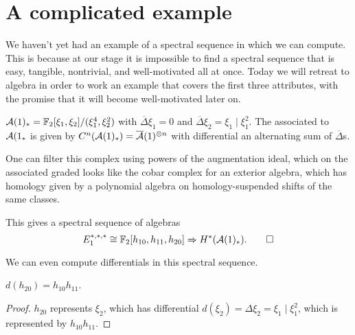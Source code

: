 \section{A complicated example}

We haven't yet had an example of a spectral sequence in which we can compute.  This is because at our stage it is impossible to find a spectral sequence that is easy, tangible, nontrivial, and well-motivated all at once.  Today we will retreat to algebra in order to work an example that covers the first three attributes, with the promise that it will become well-motivated later on.


$\mathcal A(1)_* = \mathbb F_2[\xi_1, \xi_2] / (\xi_1^4, \xi_2^2)$ with $\overline \Delta \xi_1 = 0$ and $\overline \Delta \xi_2 = \xi_1 \mid \xi_1^2$.  The  associated to $\mathcal A(1_*$ is given by $C^n(\mathcal A(1)_*) = \overline {\mathcal A}(1)^{\otimes n}$ with differential an alternating sum of $\overline \Delta$s.

One can filter this complex using powers of the augmentation ideal, which on the associated graded looks like the cobar complex for an exterior algebra, which has homology given by a polynomial algebra on homology-suspended shifts of the same classes.

\begin{theorem}[May]
This gives a spectral sequence of algebras \[E_1^{*, *, *} \cong \mathbb F_2[h_{10}, h_{11}, h_{20}] \Rightarrow H^*(\mathcal A(1)_*). \qed\]
\end{theorem}

We can even compute differentials in this spectral sequence.

\begin{lemma}
$d(h_{20}) = h_{10} h_{11}$.
\end{lemma}
\begin{proof}
$h_{20}$ represents $\xi_2$, which has differential $d(\xi_2) = \Delta \xi_2 = \xi_1 \mid \xi_1^2$, which is represented by $h_{10} h_{11}$.
\end{proof}

